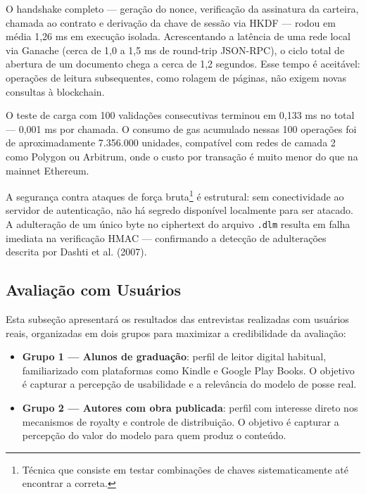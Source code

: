 \documentclass[12pt]{article}
\begin{document}
O handshake completo — geração do nonce, verificação da assinatura da carteira, chamada ao contrato e derivação da chave de sessão via HKDF — rodou em média 1,26 ms em execução isolada. Acrescentando a latência de uma rede local via Ganache (cerca de 1,0 a 1,5 ms de round-trip JSON-RPC), o ciclo total de abertura de um documento chega a cerca de 1,2 segundos. Esse tempo é aceitável: operações de leitura subsequentes, como rolagem de páginas, não exigem novas consultas à blockchain.

O teste de carga com 100 validações consecutivas terminou em 0,133 ms no total — 0,001 ms por chamada. O consumo de gas acumulado nessas 100 operações foi de aproximadamente 7.356.000 unidades, compatível com redes de camada 2 como Polygon ou Arbitrum, onde o custo por transação é muito menor do que na mainnet Ethereum.

A segurança contra ataques de força bruta\footnote{Técnica que consiste em testar combinações de chaves sistematicamente até encontrar a correta.} é estrutural: sem conectividade ao servidor de autenticação, não há segredo disponível localmente para ser atacado. A adulteração de um único byte no ciphertext do arquivo \texttt{.dlm} resulta em falha imediata na verificação HMAC — confirmando a detecção de adulterações descrita por Dashti et al. (2007).

\subsection{Avaliação com Usuários}


Esta subseção apresentará os resultados das entrevistas realizadas com usuários reais,
organizadas em dois grupos para maximizar a credibilidade da avaliação:

\begin{itemize}
    \item \textbf{Grupo 1 — Alunos de graduação}: perfil de leitor digital habitual, familiarizado com plataformas como Kindle e Google Play Books. O objetivo é capturar a percepção de usabilidade e a relevância do modelo de posse real.
    \item \textbf{Grupo 2 — Autores com obra publicada}: perfil com interesse direto nos mecanismos de royalty e controle de distribuição. O objetivo é capturar a percepção do valor do modelo para quem produz o conteúdo.
\end{itemize}
\end{document}
